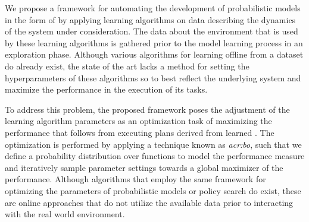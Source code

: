 We propose a framework for automating the development of probabilistic models in the form of  by applying learning algorithms on data describing the dynamics of the system under consideration.
The data about the environment that is used by these learning algorithms is gathered prior to the model learning process in an exploration phase.
Although various algorithms for learning  offline from a dataset \cite{shatkay1997learning, welch2003hidden, nikovski2002state} do already exist, the state of the art lacks a method for setting the hyperparameters of these algorithms so to best reflect the underlying system and maximize the performance in the execution of its tasks.

To address this problem, the proposed framework poses the adjustment of the learning algorithm parameters as an optimization task of maximizing the performance that follows from executing plans derived from learned .
The optimization is performed by applying a technique known as \textit{\acrfull{acr:bo}}, such that we define a probability distribution over functions to model the performance measure and iteratively sample parameter settings towards a global maximizer of the performance.
Although algorithms that employ the same framework for optimizing the parameters of probabilistic models \cite{ghavamzadeh2015bayesian, guez2012efficient} or policy search \cite{deisenroth2011pilco, wilson2014using} do exist, these are online approaches that do not utilize the available data prior to interacting with the real world environment.


